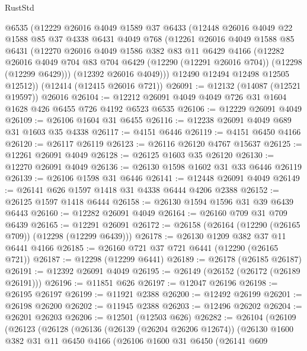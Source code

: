 \begin{lexlean}{RustStd}
\begin{coremodule}
{\begin{coremodule}
{{{{{{{{{{{{{{{{{{{{{{{{{{{{{{{{{{{{{{{{{{{{{{{{{{    @6535
    (@12229
      @26016
      @4049
      @1589
      @37
      @6433
      (@12448
        @26016
        @4049
        @22
        @1588
        @85
        @37
        @4338
        @6431
        @4049
        @768
        (@12261
          @26016
          @4049
          @1588
          @85
          @6431
          (@12270
            @26016
            @4049
            @1586
            @382
            @83
            @11
            @6429
            @4166
            (@12282
              @26016
              @4049
              @704
              @83
              @704
              @6429
              (@12290 (@12291 @26016 @704))
              (@12298 (@12299 @6429)))
            (@12392 @26016 @4049)))
        @12490
        @12494
        @12498
        @12505
        @12512))
    (@12414 (@12415 @26016 @721))
@26091 := @12132 (@14087 (@12521 @19597)) @26016
@26104 := @12212 @26091 @4049 @4049 @726 @31 @1604 @1628 @426 @6455 @726 @4192 @6523 @6535
@26106 := @12229 @26091 @4049
@26109 := @26106 @1604 @31 @6455
@26116 := @12238 @26091 @4049 @689 @31 @1603 @35 @4338
@26117 := @4151 @6446
@26119 := @4151 @6450 @4166
@26120 := @26117 @26119
@26123 := @26116 @26120 @4767 @15637
@26125 := @12261 @26091 @4049
@26128 := @26125 @1603 @35 @26120
@26130 := @12270 @26091 @4049
@26136 := @26130 @1598 @1602 @31 @33 @6446 @26119
@26139 := @26106 @1598 @31 @6446
@26141 := @12448 @26091 @4049
@26149 := @26141 @626 @1597 @1418 @31 @4338 @6444 @4206 @2388
@26152 := @26125 @1597 @1418 @6444
@26158 := @26130 @1594 @1596 @31 @39 @6439 @6443
@26160 := @12282 @26091 @4049
@26164 := @26160 @709 @31 @709 @6439
@26165 := @12291 @26091
@26172 := @26158 (@26164 (@12290 (@26165 @709)) (@12298 (@12299 @6439)))
@26178 := @26130 @1209 @382 @37 @11 @6441 @4166
@26185 := @26160 @721 @37 @721 @6441 (@12290 (@26165 @721))
@26187 := @12298 (@12299 @6441)
@26189 := @26178 (@26185 @26187)
@26191 := @12392 @26091 @4049
@26195 := @26149 (@26152 (@26172 (@26189 @26191)))
@26196 := @11851 @626
@26197 := @12047 @26196
@26198 := @26195 @26197
@26199 := @11921 @2388
@26200 := @12492 @26199
@26201 := @26198 @26200
@26202 := @11945 @2388
@26203 := @12496 @26202
@26204 := @26201 @26203
@26206 := @12501 (@12503 @626)
@26282 := @26104
    (@26109
      (@26123
        (@26128
          (@26136
            (@26139 (@26204 @26206 @12674))
            (@26130
              @1600
              @382
              @31
              @11
              @6450
              @4166
              (@26106
                @1600
                @31
                @6450
                (@26141
                  @609
}}}}}}}}}}}}}}}}}}}}}}}}}}}}}}}}}}}}}}}}}}}}}}}}}}
\end{coremodule}}
\end{coremodule}
\end{lexlean}

